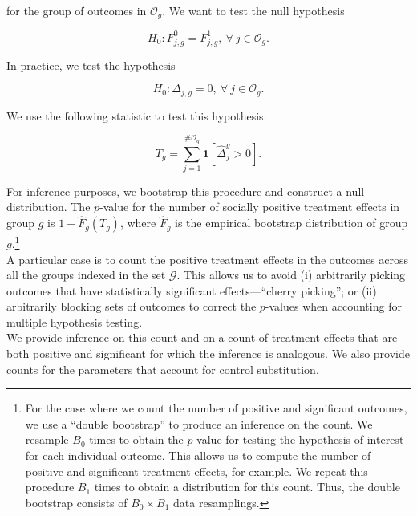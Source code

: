 \noindent for the group of outcomes in $\mathcal{O}_{g}$. We want to test the null hypothesis 


\begin{equation}
H_{0} : F_{j,g}^0 = F_{j,g}^1, \ \forall \ j \in \mathcal{O}_{g}. 
\end{equation}

\noindent In practice, we test the hypothesis  

\begin{equation}
H_{0} : \Delta_{j,g} = 0, \ \forall \ j \in \mathcal{O}_{g}. 
\end{equation}

\noindent We use the following statistic to test this hypothesis: 

\begin{equation}
T_{g} = \sum _{j=1}^{\# \mathcal{O}_g} \mathbf{1} \left[ \widehat{\Delta}_{j}^{g} > 0\right]. \label{eq:count}
\end{equation} 

\noindent For inference purposes, we bootstrap this procedure and construct a null distribution. The $p$-value for the number of socially positive treatment effects in group $g$ is $1 - \widehat{F}_{g} \left( T_{g} \right)$, where $ \widehat{F}_{g}$ is the empirical bootstrap distribution of group $g$.\footnote{For the case where we count the number of positive and significant outcomes, we use a ``double bootstrap'' to produce an inference on the count. We resample $B_{0}$ times to obtain the $p$-value for testing the hypothesis of interest for each individual outcome. This allows us to compute the number of positive and significant treatment effects, for example. We repeat this procedure $B_{1}$ times to obtain a distribution for this count. Thus, the double bootstrap consists of $B_{0} \times B_{1}$ data resamplings.}\\

\noindent A particular case is to count the positive treatment effects in the outcomes across all the groups indexed in the set $\mathcal{G}$. This allows us to avoid (i) arbitrarily picking outcomes that have statistically significant effects---``cherry picking''; or (ii) arbitrarily blocking sets of outcomes to correct the $p$-values when accounting for multiple hypothesis testing.\\

\noindent We provide inference on this count and on a count of treatment effects that are both positive and significant for which the inference is analogous. We also provide counts for the parameters that account for control substitution.

